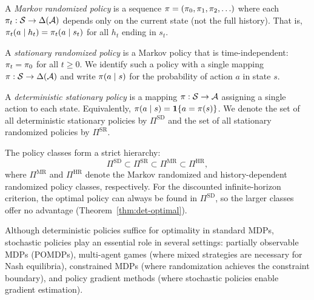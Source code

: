 \documentclass[11pt,a4paper]{article}
\begin{document}
\begin{definition}
\label{def:markov-policy}
A \emph{Markov randomized policy} is a sequence
$\pi = (\pi_0, \pi_1, \pi_2, \ldots)$ where each
$\pi_t : \mathcal{S} \to \Delta(\mathcal{A})$ depends only on the
current state (not the full history). That is,
$\pi_t(a \mid h_t) = \pi_t(a \mid s_t)$ for all $h_t$
ending in $s_t$.
\end{definition}

\begin{definition}
\label{def:stationary-policy}
A \emph{stationary randomized policy} is a Markov policy that is
time-independent: $\pi_t = \pi_0$ for all $t \geq 0$. We
identify such a policy with a single mapping
$\pi : \mathcal{S} \to \Delta(\mathcal{A})$ and write
$\pi(a \mid s)$ for the probability of action $a$ in state $s$.
\end{definition}

\begin{definition}
\label{def:det-policy}
A \emph{deterministic stationary policy} is a mapping
$\pi : \mathcal{S} \to \mathcal{A}$ assigning a single action to each
state. Equivalently, $\pi(a \mid s) = \mathbf{1}\{a = \pi(s)\}$.
We denote the set of all deterministic stationary policies by
$\Pi^{\mathrm{SD}}$ and the set of all stationary randomized policies
by $\Pi^{\mathrm{SR}}$.
\end{definition}

\begin{remark}
\label{rem:policy-hierarchy}
The policy classes form a strict hierarchy:
\[
    \Pi^{\mathrm{SD}} \subset \Pi^{\mathrm{SR}} \subset
    \Pi^{\mathrm{MR}} \subset \Pi^{\mathrm{HR}},
\]
where $\Pi^{\mathrm{MR}}$ and $\Pi^{\mathrm{HR}}$ denote the Markov
randomized and history-dependent randomized policy classes,
respectively. For the discounted infinite-horizon criterion, the
optimal policy can always be found in $\Pi^{\mathrm{SD}}$, so the
larger classes offer no advantage (Theorem~\ref{thm:det-optimal}).
\end{remark}

\begin{warning}[title={Stochastic Policies Are Not Redundant}]
Although deterministic policies suffice for optimality in standard
MDPs, stochastic policies play an essential role in several settings:
partially observable MDPs (POMDPs), multi-agent games (where mixed
strategies are necessary for Nash equilibria), constrained MDPs (where
randomization achieves the constraint boundary), and policy gradient
methods (where stochastic policies enable gradient estimation).
\end{warning}
\end{document}
